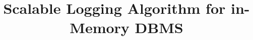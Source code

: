 \documentclass[12pt]{article}
\begin{document}
\doublespacing

\title{Scalable Logging Algorithm for in-Memory DBMS}

\maketitle










\newpage


\end{document}
